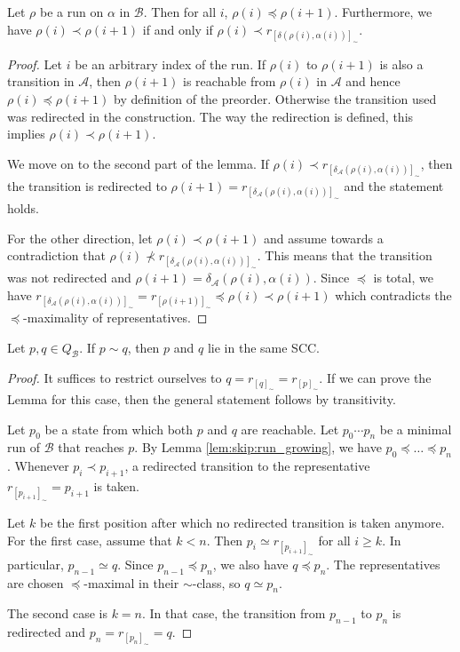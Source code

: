 \begin{lem}
\label{lem:skip:run_growing}
	Let $\rho$ be a run on $\alpha$ in $\mathcal{B}$. Then for all $i$, $\rho(i) \preceq \rho(i+1)$.
	Furthermore, we have $\rho(i) \prec \rho(i+1)$ if and only if $\rho(i) \prec r_{[\delta(\rho(i), \alpha(i))]_\sim}$.
\end{lem}

\begin{proof}
	Let $i$ be an arbitrary index of the run. If $\rho(i)$ to $\rho(i+1)$ is also a transition in $\mathcal{A}$, then $\rho(i+1)$ is reachable from $\rho(i)$ in $\mathcal{A}$ and hence $\rho(i) \preceq \rho(i+1)$ by definition of the preorder. Otherwise the transition used was redirected in the construction. The way the redirection is defined, this implies $\rho(i) \prec \rho(i+1)$.
	
	We move on to the second part of the lemma. If $\rho(i) \prec r_{[\delta_\mathcal{A}(\rho(i), \alpha(i))]_\sim}$, then the transition is redirected to $\rho(i+1) = r_{[\delta_\mathcal{A}(\rho(i), \alpha(i))]_\sim}$ and the statement holds. 
	
	For the other direction, let $\rho(i) \prec \rho(i+1)$ and assume towards a contradiction that $\rho(i) \not\prec r_{[\delta_\mathcal{A}(\rho(i), \alpha(i))]_\sim}$. This means that the transition was not redirected and $\rho(i+1) = \delta_\mathcal{A}(\rho(i), \alpha(i))$. Since $\preceq$ is total, we have $r_{[\delta_\mathcal{A}(\rho(i), \alpha(i))]_\sim} = r_{[\rho(i+1)]_\sim} \preceq \rho(i) \prec \rho(i+1)$ which contradicts the $\preceq$-maximality of representatives.
\end{proof}

\begin{lem}
\label{lem:skip:equiv_same_scc}
	Let $p, q \in Q_\mathcal{B}$. If $p \sim q$, then $p$ and $q$ lie in the same SCC. 
\end{lem}

\begin{proof}
	It suffices to restrict ourselves to $q = r_{[q]_\sim} = r_{[p]_\sim}$. If we can prove the Lemma for this case, then the general statement follows by transitivity.
	
	Let $p_0$ be a state from which both $p$ and $q$ are reachable. Let $p_0 \cdots p_n$ be a minimal run of $\mathcal{B}$ that reaches $p$. By Lemma \ref{lem:skip:run_growing}, we have $p_0 \preceq \dots \preceq p_n$. Whenever $p_i \prec p_{i+1}$, a redirected transition to the representative $r_{[p_{i+1}]_\sim} = p_{i+1}$ is taken. 
	
	Let $k$ be the first position after which no redirected transition is taken anymore. For the first case, assume that $k < n$. Then $p_i \simeq r_{[p_{i+1}]_\sim}$ for all $i \geq k$. In particular, $p_{n-1} \simeq q$. Since $p_{n-1} \preceq p_n$, we also have $q \preceq p_n$. The representatives are chosen $\preceq$-maximal in their $\sim$-class, so $q \simeq p_n$.
	
	The second case is $k = n$. In that case, the transition from $p_{n-1}$ to $p_n$ is redirected and $p_n = r_{[p_n]_\sim} = q$.
\end{proof}


